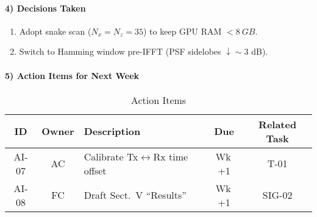 \documentclass{article}
\begin{document}
\paragraph{4) Decisions Taken}%
\begin{enumerate}
  \item Adopt snake scan ($N_x\!=\!N_z\!=\!35$) to keep GPU RAM $<\SI{8}{GB}$.
  \item Switch to Hamming window pre-IFFT (PSF sidelobes $\downarrow \sim3$ dB).
\end{enumerate}

\paragraph{5) Action Items for Next Week}%
\begin{table}[htbp]
\caption{Action Items}
\label{tab:action_items}
\centering
\begin{tabular}{|c|c|p{3cm}|c|c|}
\hline
ID & Owner & Description & Due & Related Task \\
\hline
AI-07 & AC & Calibrate Tx$\leftrightarrow$Rx time offset & Wk\,+1 & T-01 \\
AI-08 & FC & Draft Sect.~V ``Results'' & Wk\,+1 & SIG-02\\
\hline
\end{tabular}
\end{table}
\end{document}
